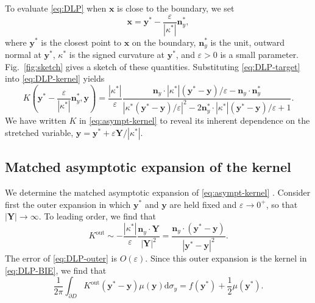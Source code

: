 \documentclass{article}[12pt]
\renewcommand{\epsilon}{\varepsilon}
\numberwithin{equation}{section}
\begin{document}
To evaluate \eqref{eq:DLP} when $\mathbf{x}$ is close to the boundary,
we set
\begin{equation}
  \mathbf{x} = \mathbf{y}^{\ast} - \frac{\epsilon}
{  |\kappa^{\ast}| }\mathbf{n}_{y}^{\ast},
  \label{eq:DLP-target}
\end{equation}
where  $\mathbf{y}^{\ast}$ is the closest point to $\mathbf{x}$ on
the boundary, $\mathbf{n}_{y}^{\ast}$ is the unit, outward
normal at $\mathbf{y}^{\ast}$, $\kappa^{\ast}$ is the signed
curvature at $\mathbf{y}^{\ast}$, and $\epsilon >0$ is a small
parameter.  Fig.~\ref{fig:sketch} gives a sketch of these
quantities.  Substituting \eqref{eq:DLP-target} into
\eqref{eq:DLP-kernel} yields
\begin{equation}
  K \left(\mathbf{y}^{\ast} - \frac{\epsilon}
{  |\kappa^{\ast}| }\mathbf{n}_{y}^{\ast},
  \mathbf{y} \right) =
  \frac{|\kappa^{\ast}|}{\epsilon} \frac{\mathbf{n}_{y}
    \cdot |\kappa^{\ast}| ( \mathbf{y}^{\ast} - \mathbf{y} )/\epsilon -
    \mathbf{n}_{y} \cdot \mathbf{n}_{y}^{\ast}}{| \kappa^{\ast} (
    \mathbf{y}^{\ast} - \mathbf{y} )/\epsilon |^{2} - 2
    \mathbf{n}_{y}^{\ast} \cdot |\kappa^{\ast}| ( \mathbf{y}^{\ast} -
    \mathbf{y} )/\epsilon + 1}.
  \label{eq:asympt-kernel}
\end{equation}
We have written $K$ in \eqref{eq:asympt-kernel} to reveal its inherent
dependence on the stretched variable,
$\mathbf{y} = \mathbf{y}^{\ast} + \epsilon
\mathbf{Y}/|\kappa^{\ast}|$.

\subsection{Matched asymptotic expansion of the kernel}
\label{ssec:asymp}

We determine the matched asymptotic expansion of
\eqref{eq:asympt-kernel} \cite{bender1999advanced}.  Consider first
the outer expansion in which $\mathbf{y}^{\ast}$ and $\mathbf{y}$ are
held fixed and $\epsilon \to 0^{+}$, so that
$|\mathbf{Y}| \to \infty$. To leading order, we find that
\begin{equation}
  K^{\text{out}} \sim -\frac{|\kappa^{\ast}|}{\epsilon}
  \frac{\mathbf{n}_{y} \cdot \mathbf{Y}}{|\mathbf{Y}|^{2}} =
  \frac{\mathbf{n}_{y} \cdot ( \mathbf{y}^{\ast} - \mathbf{y} )}{|
    \mathbf{y}^{\ast} - \mathbf{y} |^{2} }.
  \label{eq:DLP-outer}
\end{equation}
The error of \eqref{eq:DLP-outer} is $O(\epsilon)$.  Since this outer
expansion 
%
is the kernel in \eqref{eq:DLP-BIE}, we find that
%
\begin{equation}
  \frac{1}{2\pi} \int_{\partial D} K^{\text{out}}(\mathbf{y}^{\ast} -
  \mathbf{y}) \mu(\mathbf{y}) \mathrm{d}\sigma_{y} =
  f(\mathbf{y}^{\ast}) + \frac{1}{2} \mu(\mathbf{y}^{\ast}).
  \label{eq:outerDLP}
\end{equation}
\end{document}
